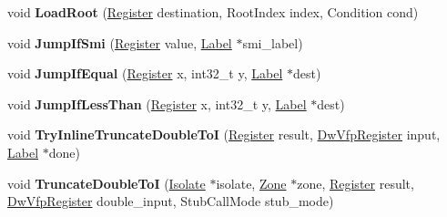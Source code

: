 \begin{DoxyCompactItemize}
void {\bfseries Load\+Root} (\mbox{\hyperlink{classv8_1_1internal_1_1Register}{Register}} destination, Root\+Index index, Condition cond)
\item 
\mbox{\label{classv8_1_1internal_1_1TurboAssembler_ada5413869bfc081b99ba85a5beeb183a}} 
void {\bfseries Jump\+If\+Smi} (\mbox{\hyperlink{classv8_1_1internal_1_1Register}{Register}} value, \mbox{\hyperlink{classv8_1_1internal_1_1Label}{Label}} $\ast$smi\+\_\+label)
\item 
\mbox{\label{classv8_1_1internal_1_1TurboAssembler_a3108cf3dc34b0d0fd8187b548b7abd38}} 
void {\bfseries Jump\+If\+Equal} (\mbox{\hyperlink{classv8_1_1internal_1_1Register}{Register}} x, int32\+\_\+t y, \mbox{\hyperlink{classv8_1_1internal_1_1Label}{Label}} $\ast$dest)
\item 
\mbox{\label{classv8_1_1internal_1_1TurboAssembler_a8faf2d84cd38057638839ccac2ea4dc9}} 
void {\bfseries Jump\+If\+Less\+Than} (\mbox{\hyperlink{classv8_1_1internal_1_1Register}{Register}} x, int32\+\_\+t y, \mbox{\hyperlink{classv8_1_1internal_1_1Label}{Label}} $\ast$dest)
\item 
\mbox{\label{classv8_1_1internal_1_1TurboAssembler_a39b65e4bef0c33123a9231bfbbc62e62}} 
void {\bfseries Try\+Inline\+Truncate\+Double\+ToI} (\mbox{\hyperlink{classv8_1_1internal_1_1Register}{Register}} result, \mbox{\hyperlink{classv8_1_1internal_1_1DwVfpRegister}{Dw\+Vfp\+Register}} input, \mbox{\hyperlink{classv8_1_1internal_1_1Label}{Label}} $\ast$done)
\item 
\mbox{\label{classv8_1_1internal_1_1TurboAssembler_a7c50d38921de0eb24d7e1eab416cb076}} 
void {\bfseries Truncate\+Double\+ToI} (\mbox{\hyperlink{classv8_1_1internal_1_1Isolate}{Isolate}} $\ast$isolate, \mbox{\hyperlink{classv8_1_1internal_1_1Zone}{Zone}} $\ast$zone, \mbox{\hyperlink{classv8_1_1internal_1_1Register}{Register}} result, \mbox{\hyperlink{classv8_1_1internal_1_1DwVfpRegister}{Dw\+Vfp\+Register}} double\+\_\+input, Stub\+Call\+Mode stub\+\_\+mode)
\item 
\mbox{\label{classv8_1_1internal_1_1TurboAssembler_aa16613398f285db035f7aa8f99249b56}} 

\end{DoxyCompactItemize}
